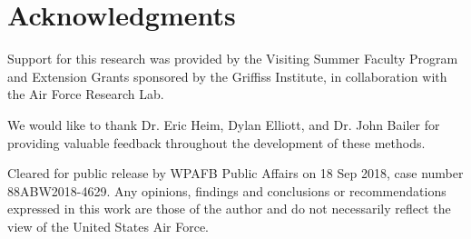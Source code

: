 \documentclass[letterpaper]{article} %
\begin{document}
\section{Acknowledgments} 

Support for this research was provided by the Visiting Summer Faculty Program and Extension Grants sponsored by the Griffiss Institute, in collaboration with the Air Force Research Lab. 

We would like to thank Dr. Eric Heim, Dylan Elliott, and Dr. John Bailer for providing valuable feedback throughout the development of these methods. 

Cleared for public release by WPAFB Public Affairs on 18 Sep 2018, case number 88ABW2018-4629.  Any opinions, findings and conclusions or recommendations expressed in this work are those of the author and do not necessarily reflect the view of the United States Air Force.

\newpage



\end{document}
